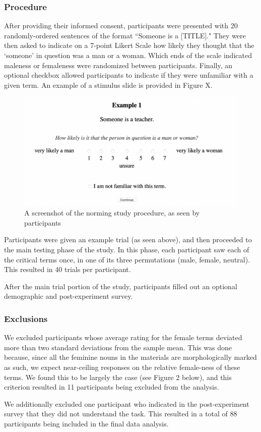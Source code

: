 \documentclass{article}
\begin{document}
	\subsubsection{Procedure}
	After providing their informed consent, participants were presented with 20 randomly-ordered sentences of the format ``Someone is a [TITLE]." They were then asked to indicate on a 7-point Likert Scale how likely they thought that the `someone' in question was a man or a woman. Which ends of the scale indicated maleness or femaleness were randomized between participants. Finally, an optional checkbox allowed participants to indicate if they were unfamiliar with a given term. An example of a stimulus slide is provided in Figure X. 
	
	\begin{figure}[h!]
		\centering
		\includegraphics[scale=0.5]{norming_capture}
		\caption{A screenshot of the norming study procedure, as seen by participants}
	\end{figure}

	Participants were given an example trial (as seen above), and then proceeded to the main testing phase of the study. In this phase, each participant saw each of the critical terms once, in one of its three permutations (male, female, neutral). This resulted in 40 trials per participant.\par 
	After the main trial portion of the study, participants filled out an optional demographic and post-experiment survey.
	
	\subsubsection{Exclusions}
	We excluded participants whose average rating for the female terms deviated more than two standard deviations from the sample mean. This was done because, since all the feminine nouns in the materials are morphologically marked as such, we expect near-ceiling responses on the relative female-ness of these terms. We found this to be largely the case (see Figure 2 below), and this criterion resulted in 11 participants being excluded from the analysis.\par 
	We additionally excluded one participant who indicated in the post-experiment survey that they did not understand the task. This resulted in a total of 88 participants being included in the final data analysis.  
	
\end{document}
